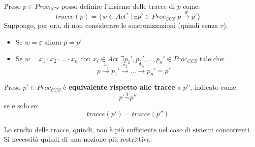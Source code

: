 Preso $p \in Proc_{CCS}$ posso definire l'insieme delle tracce di $p$ come:
\begin{equation}
    tracce(p) = \{w \in Act^{\ast}\ |\ \exists p' \in Proc_{CCS} \ p \xrightarrow{w} p'\}
\end{equation}
Suppongo, per ora, di non considerare le sincronizzazioni (quindi senza $\tau$).
\begin{itemize}
    \item Se $w = \varepsilon$ allora $p =  p'$
    \item Se $w = x_1 \cdot x_2 \cdot \dots \cdot x_n$ con $x_i \in Act$
          $\exists p_1', p_2', \dots, p_n' \in Proc_{CCS}$ tale che:
          $$p \xrightarrow{x_1} p_1' \xrightarrow{x_2} \dots \xrightarrow{x_n} p_n' = p'$$
\end{itemize}
\begin{teorema}
    Preso $p' \in Proc_{CCS}$ è \textbf{equivalente rispetto alle tracce} a $p''$,
    indicato come: $$p' \stackrel{T}{\sim}  p''$$ se e solo se:
    \begin{equation}
        tracce(p') = tracce(p'')
    \end{equation}
\end{teorema}
Lo studio delle tracce, quindi, non è più sufficiente nel caso di sistemi concorrenti.
Si necessità quindi di una nozione più restrittiva.
